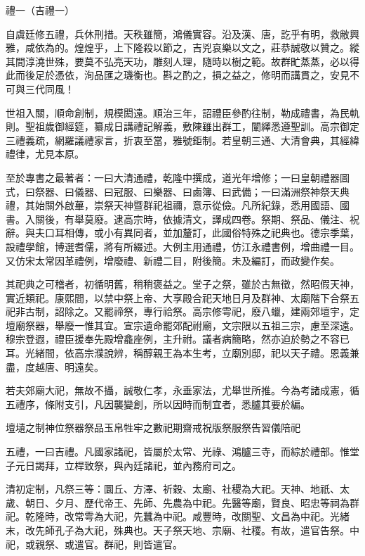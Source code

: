 
\begin{pinyinscope}
禮一（吉禮一）

自虞廷修五禮，兵休刑措。天秩雖簡，鴻儀實容。沿及漢、唐，訖乎有明，救敝興雅，咸依為的。煌煌乎，上下隆殺以節之，吉兇哀樂以文之，莊恭誠敬以贊之。縱其間淳澆世殊，要莫不弘亮天功，雕刻人理，隨時以樹之範。故群甿蒸蒸，必以得此而後足於憑依，洵品匯之璣衡也。斟之酌之，損之益之，修明而講貫之，安見不可與三代同風！

世祖入關，順命創制，規模閎遠。順治三年，詔禮臣參酌往制，勒成禮書，為民軌則。聖祖歲御經筵，纂成日講禮記解義，敷陳雖出群工，闡繹悉遵聖訓。高宗御定三禮義疏，網羅議禮家言，折衷至當，雅號鉅制。若皇朝三通、大清會典，其經緯禮律，尤見本原。

至於專書之最著者：一曰大清通禮，乾隆中撰成，道光年增修；一曰皇朝禮器圖式，曰祭器、曰儀器、曰冠服、曰樂器、曰鹵簿、曰武備；一曰滿洲祭神祭天典禮，其始關外啟蓽，崇祭天神暨群祀祖禰，意示從儉。凡所紀錄，悉用國語、國書。入關後，有舉莫廢。逮高宗時，依據清文，譯成四卷。祭期、祭品、儀注、祝辭。與夫口耳相傳，或小有異同者，並加釐訂，此國俗特殊之祀典也。德宗季葉，設禮學館，博選耆儒，將有所綴述。大例主用通禮，仿江永禮書例，增曲禮一目。又仿宋太常因革禮例，增廢禮、新禮二目，附後簡。未及編訂，而政變作矣。

其祀典之可稽者，初循明舊，稍稍褒益之。堂子之祭，雖於古無徵，然昭假天神，實近類祀。康熙間，以禁中祭上帝、大享殿合祀天地日月及群神、太廟階下合祭五祀非古制，詔除之。又罷禘祭，專行祫祭。高宗修雩祀，廢八蠟，建兩郊壇宇，定壇廟祭器，舉廢一惟其宜。宣宗遺命罷郊配祔廟，文宗限以五祖三宗，慮至深遠。穆宗登遐，禮臣援奉先殿增龕座例，主升祔。議者病簡略，然亦迫於勢之不容已耳。光緒間，依高宗濮說辨，稱醇親王為本生考，立廟別邸，祀以天子禮。恩義兼盡，度越唐、明遠矣。

若夫郊廟大祀，無故不攝，誠敬仁孝，永垂家法，尤舉世所推。今為考諸成憲，循五禮序，條附支引，凡因襲變創，所以因時而制宜者，悉臚其要於編。

壇壝之制神位祭器祭品玉帛牲牢之數祀期齋戒祝版祭服祭告習儀陪祀

五禮，一曰吉禮。凡國家諸祀，皆屬於太常、光祿、鴻臚三寺，而綜於禮部。惟堂子元日謁拜，立桿致祭，與內廷諸祀，並內務府司之。

清初定制，凡祭三等：圜丘、方澤、祈穀、太廟、社稷為大祀。天神、地祇、太歲、朝日、夕月、歷代帝王、先師、先農為中祀。先醫等廟，賢良、昭忠等祠為群祀。乾隆時，改常雩為大祀，先蠶為中祀。咸豐時，改關聖、文昌為中祀。光緒末，改先師孔子為大祀，殊典也。天子祭天地、宗廟、社稷。有故，遣官告祭。中祀，或親祭、或遣官。群祀，則皆遣官。


\end{pinyinscope}
